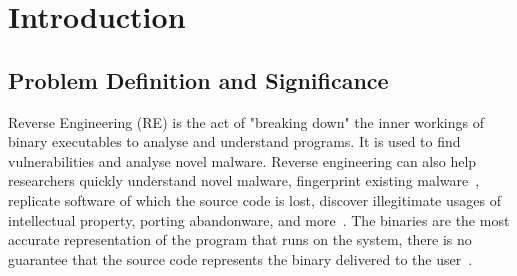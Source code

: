 \chapter{Introduction}
\label{introduction}




\section{Problem Definition and Significance}
Reverse Engineering (RE) is the act of "breaking down" the inner workings of binary executables to analyse and understand programs. It is used to find vulnerabilities and analyse novel malware. Reverse engineering can also help researchers quickly understand novel malware, fingerprint existing malware~\cite{reverseEngineerProcess}, replicate software of which the source code is lost, discover illegitimate usages of intellectual property, porting abandonware, and more~\cite{TypeInferenceSurvey}. The binaries are the most accurate representation of the program that runs on the system, there is no guarantee that the source code represents the binary delivered to the user~\cite{TypeInferenceSurvey}.

